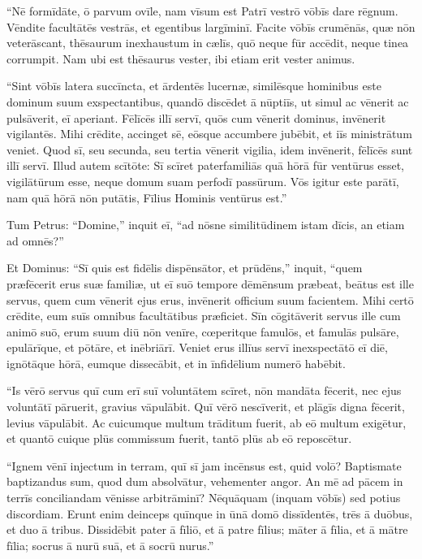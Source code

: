 \Versus ``Nē formīdāte, ō parvum ovīle, nam vīsum est Patrī vestrō vōbīs dare rēgnum.
\Versus Vēndite facultātēs vestrās, et egentibus largīminī. Facite vōbīs crumēnās, quæ nōn veterāscant, thēsaurum inexhaustum in cælīs, quō neque fūr accēdit, neque tinea corrumpit.
\Versus Nam ubi est thēsaurus vester, ibi etiam erit vester animus.

\Versus ``Sint vōbīs latera succīncta, et ārdentēs lucernæ,
\Versus similēsque hominibus este dominum suum exspectantibus, quandō discēdet ā nūptiīs, ut simul ac vēnerit ac pulsāverit, eī aperiant.
\Versus Fēlīcēs illī servī, quōs cum vēnerit dominus, invēnerit vigilantēs. Mihi crēdite, accinget sē, eōsque accumbere jubēbit, et iīs ministrātum veniet.
\Versus Quod sī, seu secunda, seu tertia vēnerit vigilia, idem invēnerit, fēlīcēs sunt illī servī.
\Versus Illud autem scītōte: Sī scīret paterfamiliās quā hōrā fūr ventūrus esset, vigilātūrum esse, neque domum suam perfodī passūrum.
\Versus Vōs igitur este parātī, nam quā hōrā nōn putātis, Fīlius Hominis ventūrus est.''

\Versus Tum Petrus: ``Domine,'' inquit eī, ``ad nōsne similitūdinem istam dīcis, an etiam ad omnēs?''

\Versus Et Dominus: ``Sī quis est fidēlis dispēnsātor, et prūdēns,'' inquit, ``quem præfēcerit erus suæ familiæ, ut eī suō tempore dēmēnsum præbeat,
\Versus beātus est ille servus, quem cum vēnerit ejus erus, invēnerit officium suum facientem.
\Versus Mihi certō crēdite, eum suīs omnibus facultātibus præficiet.
\Versus Sīn cōgitāverit servus ille cum animō suō, erum suum diū nōn venīre, cœperitque famulōs, et famulās pulsāre, epulārīque, et pōtāre, et inēbriārī.
\Versus Veniet erus illīus servī inexspectātō eī diē, ignōtāque hōrā, eumque dissecābit, et in īnfidēlium numerō habēbit.

\Versus ``Is vērō servus quī cum erī suī voluntātem scīret, nōn mandāta fēcerit, nec ejus voluntātī pāruerit, gravius vāpulābit.
\Versus Quī vērō nescīverit, et plāgīs digna fēcerit, levius vāpulābit. Ac cuicumque multum trāditum fuerit, ab eō multum exigētur, et quantō cuique plūs commissum fuerit, tantō plūs ab eō reposcētur.

\Versus ``Ignem vēnī injectum in terram, quī sī jam incēnsus est, quid volō?
\Versus Baptismate baptizandus sum, quod dum absolvātur, vehementer angor.
\Versus An mē ad pācem in terrīs conciliandam vēnisse arbitrāminī? Nēquāquam (inquam vōbīs) sed potius discordiam.
\Versus Erunt enim deinceps quīnque in ūnā domō dissīdentēs, trēs ā duōbus, et duo ā tribus.
\Versus Dissidēbit pater ā fīliō, et ā patre fīlius; māter ā fīlia, et ā mātre fīlia; socrus ā nurū suā, et ā socrū nurus.''

